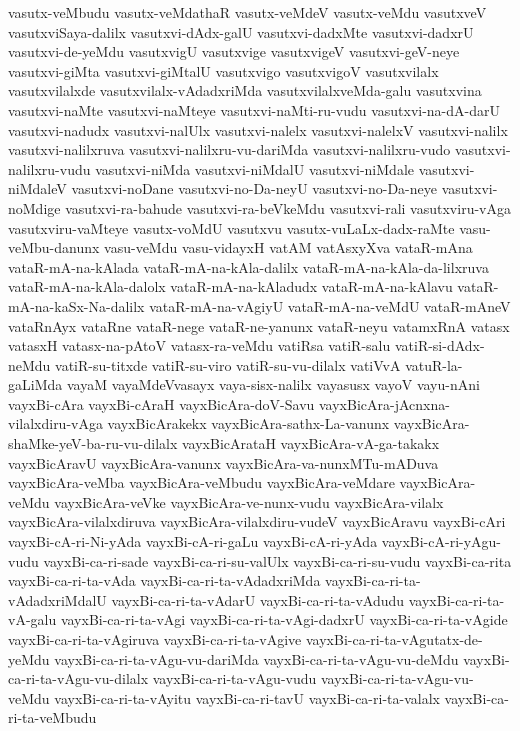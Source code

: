 {vasutx-veMbudu
vasutx-veMdathaR
vasutx-veMdeV
vasutx-veMdu
vasutxveV
vasutxviSaya-dalilx
vasutxvi-dAdx-galU
vasutxvi-dadxMte
vasutxvi-dadxrU
vasutxvi-de-yeMdu
vasutxvigU
vasutxvige
vasutxvigeV
vasutxvi-geV-neye
vasutxvi-giMta
vasutxvi-giMtalU
vasutxvigo
vasutxvigoV
vasutxvilalx
vasutxvilalxde
vasutxvilalx-vAdadxriMda
vasutxvilalxveMda-galu
vasutxvina
vasutxvi-naMte
vasutxvi-naMteye
vasutxvi-naMti-ru-vudu
vasutxvi-na-dA-darU
vasutxvi-nadudx
vasutxvi-nalUlx
vasutxvi-nalelx
vasutxvi-nalelxV
vasutxvi-nalilx
vasutxvi-nalilxruva
vasutxvi-nalilxru-vu-dariMda
vasutxvi-nalilxru-vudo
vasutxvi-nalilxru-vudu
vasutxvi-niMda
vasutxvi-niMdalU
vasutxvi-niMdale
vasutxvi-niMdaleV
vasutxvi-noDane
vasutxvi-no-Da-neyU
vasutxvi-no-Da-neye
vasutxvi-noMdige
vasutxvi-ra-bahude
vasutxvi-ra-beVkeMdu
vasutxvi-rali
vasutxviru-vAga
vasutxviru-vaMteye
vasutx-voMdU
vasutxvu
vasutx-vuLaLx-dadx-raMte
vasu-veMbu-danunx
vasu-veMdu
vasu-vidayxH
vatAM
vatAsxyXva
vataR-mAna
vataR-mA-na-kAlada
vataR-mA-na-kAla-dalilx
vataR-mA-na-kAla-da-lilxruva
vataR-mA-na-kAla-dalolx
vataR-mA-na-kAladudx
vataR-mA-na-kAlavu
vataR-mA-na-kaSx-Na-dalilx
vataR-mA-na-vAgiyU
vataR-mA-na-veMdU
vataR-mAneV
vataRnAyx
vataRne
vataR-nege
vataR-ne-yanunx
vataR-neyu
vatamxRnA
vatasx
vatasxH
vatasx-na-pAtoV
vatasx-ra-veMdu
vatiRsa
vatiR-salu
vatiR-si-dAdx-neMdu
vatiR-su-titxde
vatiR-su-viro
vatiR-su-vu-dilalx
vatiVvA
vatuR-la-gaLiMda
vayaM
vayaMdeVvasayx
vaya-sisx-nalilx
vayasusx
vayoV
vayu-nAni
vayxBi-cAra
vayxBi-cAraH
vayxBicAra-doV-Savu
vayxBicAra-jAcnxna-vilalxdiru-vAga
vayxBicArakekx
vayxBicAra-sathx-La-vanunx
vayxBicAra-shaMke-yeV-ba-ru-vu-dilalx
vayxBicArataH
vayxBicAra-vA-ga-takakx
vayxBicAravU
vayxBicAra-vanunx
vayxBicAra-va-nunxMTu-mADuva
vayxBicAra-veMba
vayxBicAra-veMbudu
vayxBicAra-veMdare
vayxBicAra-veMdu
vayxBicAra-veVke
vayxBicAra-ve-nunx-vudu
vayxBicAra-vilalx
vayxBicAra-vilalxdiruva
vayxBicAra-vilalxdiru-vudeV
vayxBicAravu
vayxBi-cAri
vayxBi-cA-ri-Ni-yAda
vayxBi-cA-ri-gaLu
vayxBi-cA-ri-yAda
vayxBi-cA-ri-yAgu-vudu
vayxBi-ca-ri-sade
vayxBi-ca-ri-su-valUlx
vayxBi-ca-ri-su-vudu
vayxBi-ca-rita
vayxBi-ca-ri-ta-vAda
vayxBi-ca-ri-ta-vAdadxriMda
vayxBi-ca-ri-ta-vAdadxriMdalU
vayxBi-ca-ri-ta-vAdarU
vayxBi-ca-ri-ta-vAdudu
vayxBi-ca-ri-ta-vA-galu
vayxBi-ca-ri-ta-vAgi
vayxBi-ca-ri-ta-vAgi-dadxrU
vayxBi-ca-ri-ta-vAgide
vayxBi-ca-ri-ta-vAgiruva
vayxBi-ca-ri-ta-vAgive
vayxBi-ca-ri-ta-vAgutatx-de-yeMdu
vayxBi-ca-ri-ta-vAgu-vu-dariMda
vayxBi-ca-ri-ta-vAgu-vu-deMdu
vayxBi-ca-ri-ta-vAgu-vu-dilalx
vayxBi-ca-ri-ta-vAgu-vudu
vayxBi-ca-ri-ta-vAgu-vu-veMdu
vayxBi-ca-ri-ta-vAyitu
vayxBi-ca-ri-tavU
vayxBi-ca-ri-ta-valalx
vayxBi-ca-ri-ta-veMbudu
}
